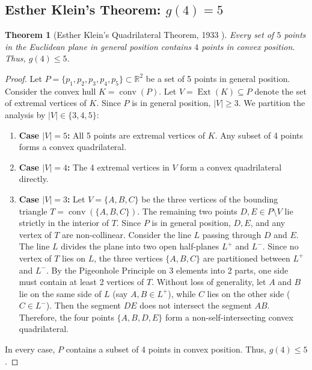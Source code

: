 \documentclass[11pt,a4paper]{article}
\newtheorem{theorem}{Theorem}[section]
\theoremstyle{definition}
\begin{document}
\subsection{Esther Klein's Theorem: $g(4) = 5$}

\begin{theorem}[Esther Klein's Quadrilateral Theorem, 1933 \cite{erdos1935}]\label{thm:klein}
Every set of $5$ points in the Euclidean plane in general position contains $4$ points in convex position. Thus, $g(4) \le 5$.
\end{theorem}

\begin{proof}
Let $P = \{p_1, p_2, p_3, p_4, p_5\} \subset \mathbb{R}^2$ be a set of 5 points in general position.
Consider the convex hull $K = \operatorname{conv}(P)$.
Let $V = \operatorname{Ext}(K) \subseteq P$ denote the set of extremal vertices of $K$.
Since $P$ is in general position, $|V| \ge 3$. We partition the analysis by $|V| \in \{3, 4, 5\}$:
\begin{enumerate}
    \item \textbf{Case $|V| = 5$:}
    All 5 points are extremal vertices of $K$. Any subset of 4 points forms a convex quadrilateral.
    \item \textbf{Case $|V| = 4$:}
    The 4 extremal vertices in $V$ form a convex quadrilateral directly.
    \item \textbf{Case $|V| = 3$:}
    Let $V = \{A, B, C\}$ be the three vertices of the bounding triangle $T = \operatorname{conv}(\{A, B, C\})$.
    The remaining two points $D, E \in P \setminus V$ lie strictly in the interior of $T$.
    Since $P$ is in general position, $D, E$, and any vertex of $T$ are non-collinear.
    Consider the line $L$ passing through $D$ and $E$.
    The line $L$ divides the plane into two open half-planes $L^+$ and $L^-$.
    Since no vertex of $T$ lies on $L$, the three vertices $\{A, B, C\}$ are partitioned between $L^+$ and $L^-$.
    By the Pigeonhole Principle on 3 elements into 2 parts, one side must contain at least 2 vertices of $T$.
    Without loss of generality, let $A$ and $B$ lie on the same side of $L$ (say $A, B \in L^+$), while $C$ lies on the other side ($C \in L^-$).
    Then the segment $DE$ does not intersect the segment $AB$.
    Therefore, the four points $\{A, B, D, E\}$ form a non-self-intersecting convex quadrilateral.
\end{enumerate}
In every case, $P$ contains a subset of 4 points in convex position. Thus, $g(4) \le 5$.
\end{proof}
\end{document}
